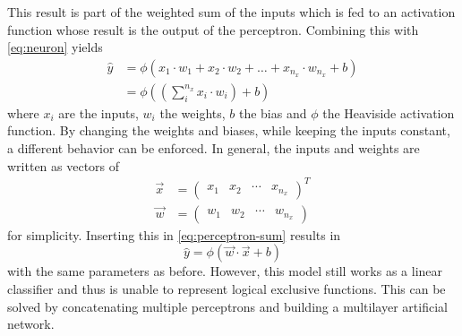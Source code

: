 This result is part of the weighted sum of the inputs which is fed to an activation function whose result is the output of the perceptron.
Combining this with \eqref{eq:neuron} yields
\begin{align}
	\label{eq:perceptron-sum}
	\hat{y} &= \phi \left( x_1 \cdot w_1 + x_2 \cdot w_2 + \ldots + x_{n_x} \cdot w_{n_x} + b \right)\\
	  &= \phi \left( \left( \sum_{i}^{n_x} x_i \cdot w_i \right) + b \right)
\end{align}
where $x_i$ are the inputs, $w_i$ the weights, $b$ the bias and $\phi$ the Heaviside activation function.
By changing the weights and biases, while keeping the inputs constant, a different behavior can be enforced.
In general, the inputs and weights are written as vectors of
\begin{align}
	\vec{x} &= \begin{pmatrix} x_1 & x_2 & \cdots & x_{n_x} \end{pmatrix}^T \\
	\vec{w} &= \begin{pmatrix} w_1 & w_2 & \cdots & w_{n_x} \end{pmatrix} 
\end{align}
for simplicity.
Inserting this in \eqref{eq:perceptron-sum} results in
\begin{equation}
	\label{eq:perceptron-activation}
	\hat{y} = \phi \left( \vec{w} \cdot \vec{x} + b \right)
\end{equation}
with the same parameters as before.
However, this model still works as a linear classifier and thus is unable to represent logical exclusive functions.
This can be solved by concatenating multiple perceptrons and building a multilayer artificial network.